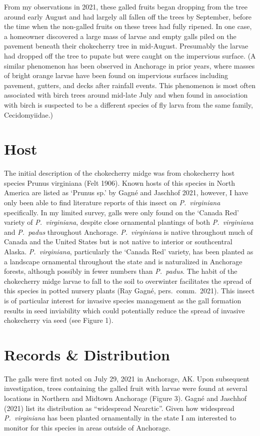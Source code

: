 From my observations in 2021, these galled fruits began dropping from the tree around early August and had largely all fallen off the trees by September, before the time when the non-galled fruits on these trees had fully ripened. In one case, a homeowner discovered a large mass of larvae and empty galls piled on the pavement beneath their chokecherry tree in mid-August. Presumably the larvae had dropped off the tree to pupate but were caught on the impervious surface. (A similar phenomenon has been observed in Anchorage in prior years, where masses of bright orange larvae have been found on impervious surfaces including pavement, gutters, and decks after rainfall events. This phenomenon is most often associated with birch trees around mid-late July and when found in association with birch is suspected to be a different species of fly larva from the same family, Cecidomyiidae.)

\section{Host}
 The initial description of the chokecherry midge was from chokecherry host species Prunus virginiana (Felt 1906). Known hosts of this species in North America are listed as `Prunus sp.' by Gagn\'{e} and Jaschhof 2021, however, I have only been able to find literature reports of this insect on \textit{P.\ virginiana} specifically. In my limited survey, galls were only found on the `Canada Red' variety of \textit{P.\ virginiana}, despite close ornamental plantings of both \textit{P.\ virginiana} and \textit{P.\ padus} throughout Anchorage. \textit{P.\ virginiana} is native throughout much of Canada and the United States but is not native to interior or southcentral Alaska. \textit{P.\ virginiana}, particularly the `Canada Red' variety, has been planted as a landscape ornamental throughout the state and is naturalized in Anchorage forests, although possibly in fewer numbers than \textit{P.\ padus}. The habit of the chokecherry midge larvae to fall to the soil to overwinter facilitates the spread of this species in potted nursery plants (Ray Gagn\'{e}, pers.\ comm.\ 2021). This insect is of particular interest for invasive species management as the gall formation results in seed inviability which could potentially reduce the spread of invasive chokecherry via seed (see Figure 1).
 
\section{Records \& Distribution} The galls were first noted on July 29, 2021 in Anchorage, AK. Upon subsequent investigation, trees containing the galled fruit with larvae were found at several locations in Northern and Midtown Anchorage (Figure 3). Gagn\'{e} and Jaschhof (2021) list its distribution as ``widespread Nearctic''. Given how widespread \textit{P.\ virginiana} has been planted ornamentally in the state I am interested to monitor for this species in areas outside of Anchorage. 

